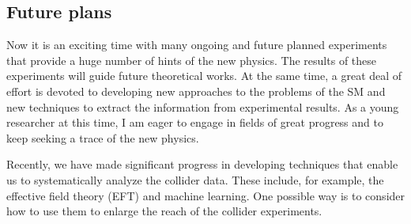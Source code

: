 \documentclass[12pt,notitlepage]{article}
\begin{document}
\vspace*{-2mm}
\subsection*{Future plans}


Now it is an exciting time with many ongoing and future planned experiments that provide a huge number of hints of the new physics.
The results of these experiments will guide future theoretical works.
At the same time, a great deal of effort is devoted to developing new approaches to the problems of the SM and new techniques to extract the information from experimental results.
As a young researcher at this time, I am eager to engage in fields of great progress and to keep seeking a trace of the new physics.

Recently, we have made significant progress in developing techniques that enable us to systematically analyze the collider data.
These include, for example, the effective field theory (EFT) and machine learning.
One possible way is to consider how to use them to enlarge the reach of the collider experiments.
\end{document}
